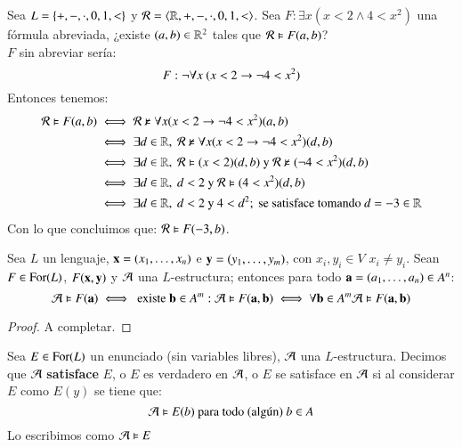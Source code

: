 \begin{eg}
    Sea $L = \left\{+, -, \cdot, 0, 1, <\right\}$ y $\mathcal{R} = \langle\mathbb{R}, +, -, \cdot, 0, 1, <\rangle$. Sea $F: \exists x (x < 2 \land 4 < x^2)$ una fórmula abreviada, ¿existe $(a, b) \in \mathbb{R}^2$ tales que $\mathcal{R} \vDash F(a, b)$?\\

    $F$ sin abreviar sería:
    $$
        F: \neg \forall x\ (x < 2 \rightarrow \neg 4 < x^2)
    $$
    Entonces tenemos:
    \begin{align*}
        \mathcal{R} \vDash F(a, b) &\iff \mathcal{R} \nvDash \forall x (x < 2 \rightarrow \neg 4 < x^2)(a, b)\\
                               &\iff\exists d \in \mathbb{R},\  \mathcal{R} \nvDash \forall x (x < 2 \rightarrow \neg 4 < x^2)(d, b)\\
                               &\iff \exists d \in \mathbb{R},\ \mathcal{R} \vDash (x < 2)(d, b) \text{ y } \mathcal{R} \nvDash(\neg 4 < x^2)(d, b)\\
                               &\iff \exists d \in \mathbb{R},\ d < 2 \text{ y } \mathcal{R} \vDash (4 < x^2)(d, b)\\
                               &\iff \exists d \in \mathbb{R},\ d < 2 \text{ y } 4 < d^2; \text{ se satisface tomando $d = -3 \in \mathbb{R}$}
    \end{align*}
    Con lo que concluimos que: $\mathcal{R} \vDash F(-3, b)$.
\end{eg}

\begin{pro}\label{pro:1.1}
    Sea $L$ un lenguaje, $\mathbf{x} = (x_1, \ldots, x_n)$ e $\mathbf{y} = (y_1, \ldots, y_m)$, con $x_i, y_i \in V$ $x_i \neq y_i$. Sean $F \in \mathrm{For}(L)$, $F(\mathbf{x}, \mathbf{y})$ y $\mathcal{A}$ una $L$-estructura; entonces para todo $\mathbf{a} = (a_1, \ldots, a_n) \in A^n$:
    $$
        \mathcal{A} \vDash F(\mathbf{a}) \iff \text{ existe } \mathbf{b} \in A^m : \mathcal{A} \vDash F(\mathbf{a}, \mathbf{b}) \iff \forall \mathbf{b} \in A^m \mathcal{A} \vDash F(\mathbf{a}, \mathbf{b})
    $$
\end{pro}

\begin{proof}
    A completar. %
\end{proof}

\begin{dfn}
    Sea $E \in \mathrm{For}(L)$ un enunciado (sin variables libres), $\mathcal{A}$ una $L$-estructura. Decimos que $\mathcal{A}$ \textbf{satisface} $E$, o $E$ es verdadero en $\mathcal{A}$, o $E$ se satisface en $\mathcal{A}$ si al considerar $E$ como $E(y)$ se tiene que:
    $$
        \mathcal{A} \vDash E(b) \text{ para todo (algún) } b\in A
    $$
    Lo escribimos como $\mathcal{A} \vDash E$
\end{dfn}

